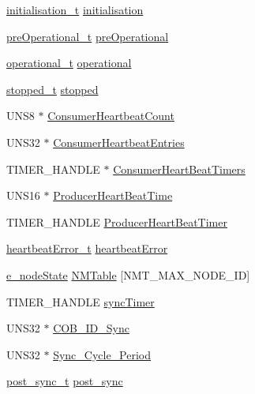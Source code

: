 \begin{CompactItemize}
\item 
\hyperlink{states_8h_d0cd6d1eb89085da7cb9f32ce386e8bc}{initialisation\_\-t} \hyperlink{structstruct__CO__Data_b45e9ca46cffe7924c35ae136db6a2b6}{initialisation}
\item 
\hyperlink{states_8h_f4a6da4fe018afbe20eaf716c248e02a}{pre\-Operational\_\-t} \hyperlink{structstruct__CO__Data_d7c66fb721e3f6279a6ff03bf91d82e2}{pre\-Operational}
\item 
\hyperlink{states_8h_8aed99e590473f26db47a9c2dc5b73fc}{operational\_\-t} \hyperlink{structstruct__CO__Data_432ddce132ec2f7473064e4fa8ef3f9a}{operational}
\item 
\hyperlink{states_8h_c99397ce6341b6b5128104aee4c27ec5}{stopped\_\-t} \hyperlink{structstruct__CO__Data_89dd7dd17f9dd16b7a06c3cf30c2ca02}{stopped}
\item 
UNS8 $\ast$ \hyperlink{structstruct__CO__Data_51a0927cdf730eca5661d2d1a26b9e43}{Consumer\-Heartbeat\-Count}
\item 
UNS32 $\ast$ \hyperlink{structstruct__CO__Data_928052654c25135aab556909845fa8ea}{Consumer\-Heartbeat\-Entries}
\item 
TIMER\_\-HANDLE $\ast$ \hyperlink{structstruct__CO__Data_e0b1fd1bec517c2bc12c5a4fd72adca6}{Consumer\-Heart\-Beat\-Timers}
\item 
UNS16 $\ast$ \hyperlink{structstruct__CO__Data_61d5500b982867b523baf6668a2c377d}{Producer\-Heart\-Beat\-Time}
\item 
TIMER\_\-HANDLE \hyperlink{structstruct__CO__Data_914dd3ff14e15217fe67c0804200a200}{Producer\-Heart\-Beat\-Timer}
\item 
\hyperlink{lifegrd_8h_eca3959d33fceb33487363a0493d3b7d}{heartbeat\-Error\_\-t} \hyperlink{structstruct__CO__Data_2ec2bc87656945d2c7dda7ebe662b245}{heartbeat\-Error}
\item 
\hyperlink{states_8h_5891f63a4c9243179838389a93d084e2}{e\_\-node\-State} \hyperlink{structstruct__CO__Data_40414cf320a3c3d6236790bd10b4301a}{NMTable} \mbox{[}NMT\_\-MAX\_\-NODE\_\-ID\mbox{]}
\item 
TIMER\_\-HANDLE \hyperlink{structstruct__CO__Data_b8e7a429eb6e0bca2429685725516fe8}{sync\-Timer}
\item 
UNS32 $\ast$ \hyperlink{structstruct__CO__Data_eb1479220ec68407a35635bfbffa3386}{COB\_\-ID\_\-Sync}
\item 
UNS32 $\ast$ \hyperlink{structstruct__CO__Data_2dddbef6ce165dca7ff916e2e1409142}{Sync\_\-Cycle\_\-Period}
\item 
\hyperlink{sync_8h_8a0b5b8c19b375ef1c985caa120f3274}{post\_\-sync\_\-t} \hyperlink{structstruct__CO__Data_7eeaefe180dfceca6e829a0a8018f342}{post\_\-sync}

\end{CompactItemize}
